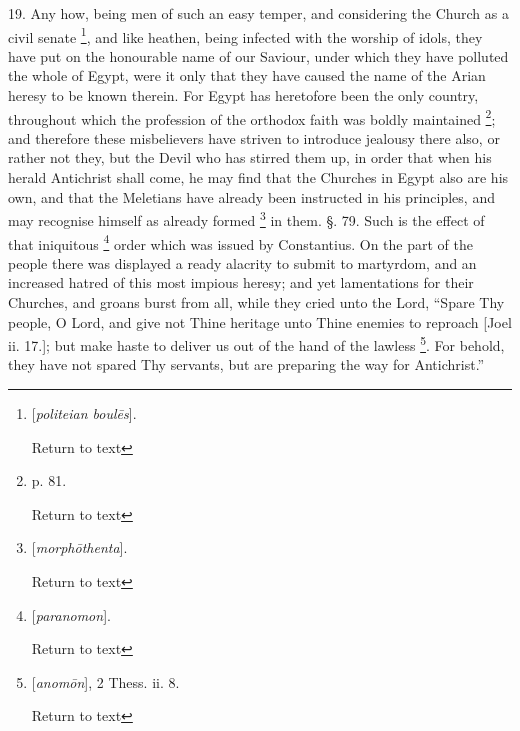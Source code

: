19. Any how, being men of such an easy temper,
and considering the Church as a civil senate \footnote{[\emph{politeian boul\={e}s}].

Return to text}, and like
heathen, being infected with the worship of idols, they have put on
the honourable name of our Saviour, under which they have polluted the
whole of Egypt, were it only that they have caused the name of the
Arian heresy to be known therein. For Egypt has heretofore been the
only country, throughout which the profession of the orthodox faith
was boldly maintained \footnote{p. 81.

Return to text}; and therefore these misbelievers have
striven to introduce jealousy there also, or rather not they, but the
Devil who has stirred them up, in order that when his herald
Antichrist shall come, he may find that the Churches in Egypt also are
his own, and that the Meletians have already been instructed in his
principles, and may recognise himself as already formed \footnote{[\emph{morph\={o}thenta}].

Return to text} in
them. §. 79. Such is the effect of that iniquitous \footnote{[\emph{paranomon}].

Return to text} order
which was issued by Constantius. On the part of the people there was
displayed a ready alacrity to submit to martyrdom, and an increased
hatred of this most impious heresy; and yet lamentations for their
Churches, and groans burst from all, while they cried unto the Lord, ``Spare
Thy people, O Lord, and give not Thine heritage unto Thine enemies to
reproach [Joel ii. 17.]; but make haste to deliver us out of the hand
of the lawless \footnote{[\emph{anom\={o}n}], 2 Thess. ii. 8.

Return to text}. For behold, they have not spared Thy
servants, but are preparing the way for Antichrist.''


